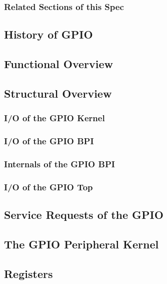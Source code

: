 \subsubsection{Related Sections of this Spec}

\subsection{History of GPIO}

\subsection{Functional Overview}
\label{subsec:gpiofunc01}

\subsection{Structural Overview}



\subsubsection{I/O of the GPIO Kernel}

\subsubsection{I/O of the GPIO BPI}

\subsubsection{Internals of the GPIO BPI}

\subsubsection{I/O of the GPIO Top}

\subsection{Service Requests of the GPIO}

\subsection{The GPIO Peripheral Kernel}
\label{subsec:gpiofunc02}


\subsection{Registers}


